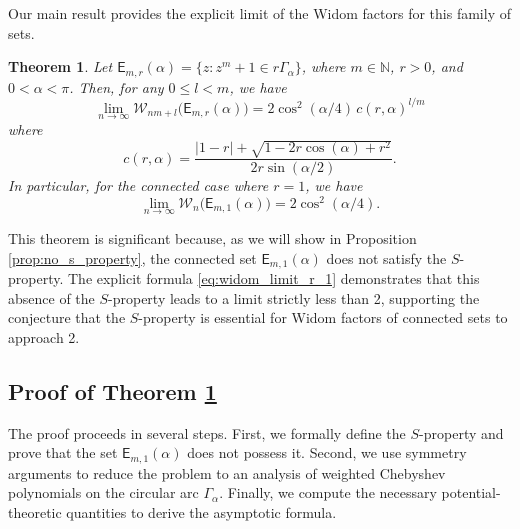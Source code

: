 \documentclass[12pt,oneside,reqno]{amsart}
\newtheorem{theorem}{Theorem}[section]
\theoremstyle{definition}
\numberwithin{equation}{section}
\newcommand{\N}{{\mathbb N}}
\newcommand{\E}{{\mathsf E}}
\newcommand{\cW}{{\mathcal{W}}}
\begin{document}
Our main result provides the explicit limit of the Widom factors for this family of sets.

\begin{theorem} 	
\label{thm:Widom_factors_lemniscatic_arcs}
	Let $\E_{m,r}(\alpha)=\{z: z^m+1\in r \Gamma_\alpha\}$, where $m\in \N$, $r>0$, and $0<\alpha<\pi$. Then, for any $0\leq l <m$, we have
\begin{equation}
   \lim_{n\rightarrow \infty}\cW_{nm+l}\bigl(\E_{m,r}(\alpha)\bigr) = 2\cos^2(\alpha/4)\, c(r,\alpha)^{l/m}
\end{equation} 	
	where
\begin{equation}
\label{eq:c_r_alpha_definition}
c(r,\alpha)=\frac{\vert 1-r \vert + \sqrt{1-2r\cos(\alpha)+r^2}}{2r\sin(\alpha/2)}.
\end{equation}
	In particular, for the connected case where $r = 1$, we have
\begin{equation}
\label{eq:widom_limit_r_1}
\lim_{n\rightarrow \infty}\cW_n\bigl(\E_{m,1}(\alpha)\bigr) = 2\cos^2(\alpha/4).
\end{equation}
\end{theorem}

This theorem is significant because, as we will show in Proposition \ref{prop:no_s_property}, the connected set $\E_{m,1}(\alpha)$ does not satisfy the $S$-property. The explicit formula \eqref{eq:widom_limit_r_1} demonstrates that this absence of the $S$-property leads to a limit strictly less than 2, supporting the conjecture that the $S$-property is essential for Widom factors of connected sets to approach 2.

\subsection{Proof of Theorem \ref{thm:Widom_factors_lemniscatic_arcs}}
The proof proceeds in several steps. First, we formally define the $S$-property and prove that the set $\E_{m,1}(\alpha)$ does not possess it. Second, we use symmetry arguments to reduce the problem to an analysis of weighted Chebyshev polynomials on the circular arc $\Gamma_\alpha$. Finally, we compute the necessary potential-theoretic quantities to derive the asymptotic formula.
\end{document}
